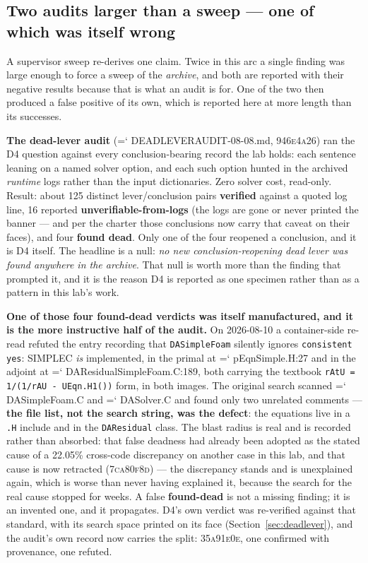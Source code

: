 \documentclass[11pt,a4paper]{article}
\newcommand{\artifact}[1]{{\small\ttfamily\hyphenchar\font=`\-\relax
  \def\_{\textunderscore\allowbreak}#1}}
\newcommand{\commit}[1]{\textsc{\small #1}}
\begin{document}
\subsection{Two audits larger than a sweep --- one of which was itself wrong}
\label{sec:audits}

A supervisor sweep re-derives one claim. Twice in this arc a single finding was large enough
to force a sweep of the \emph{archive}, and both are reported with their negative results
because that is what an audit is for. One of the two then produced a false positive of its own,
which is reported here at more length than its successes.

\textbf{The dead-lever audit} (\artifact{DEAD\_LEVER\_AUDIT\_2026-08-08.md},
\commit{946e4a26}) ran the D4 question against every conclusion-bearing record the lab holds:
each sentence leaning on a named solver option, and each such option hunted in the archived
\emph{runtime} logs rather than the input dictionaries. Zero solver cost, read-only. Result:
about 125 distinct lever/conclusion pairs \textbf{verified} against a quoted log line, 16
reported \textbf{unverifiable-from-logs} (the logs are gone or never printed the banner --- and
per the charter those conclusions now carry that caveat on their faces), and four
\textbf{found dead}. Only one of the four reopened a conclusion, and it is D4 itself. The
headline is a null: \emph{no new conclusion-reopening dead lever was found anywhere in the
archive}. That null is worth more than the finding that prompted it, and it is the reason D4 is
reported as one specimen rather than as a pattern in this lab's work.

\textbf{One of those four found-dead verdicts was itself manufactured, and it is the more
instructive half of the audit.} On 2026-08-10 a container-side re-read refuted the entry
recording that \texttt{DASimpleFoam} silently ignores \texttt{consistent yes}: SIMPLEC
\emph{is} implemented, in the primal at \artifact{pEqnSimple.H:27} and in the adjoint at
\artifact{DAResidualSimpleFoam.C:189}, both carrying the textbook
\texttt{rAtU = 1/(1/rAU - UEqn.H1())} form, in both images. The original search
scanned \artifact{DASimpleFoam.C} and \artifact{DASolver.C} and found only two unrelated
comments --- \textbf{the file list, not the search string, was the defect}: the equations live
in a \texttt{.H} include and in the \texttt{DAResidual} class. The blast radius is real and is
recorded rather than absorbed: that false deadness had already been adopted as the stated cause
of a 22.05\% cross-code discrepancy on another case in this lab, and that cause is now
retracted (\commit{7ca80f8d}) --- the discrepancy stands and is unexplained again, which is
worse than never having explained it, because the search for the real cause stopped for weeks.
A false \textbf{found-dead} is not a missing finding; it is an invented one, and it propagates.
D4's own verdict was re-verified against that standard, with its search space printed on its
face (Section~\ref{sec:deadlever}), and the audit's own record now carries the split:
\commit{35a91e0e}, one confirmed with provenance, one refuted.
\end{document}
